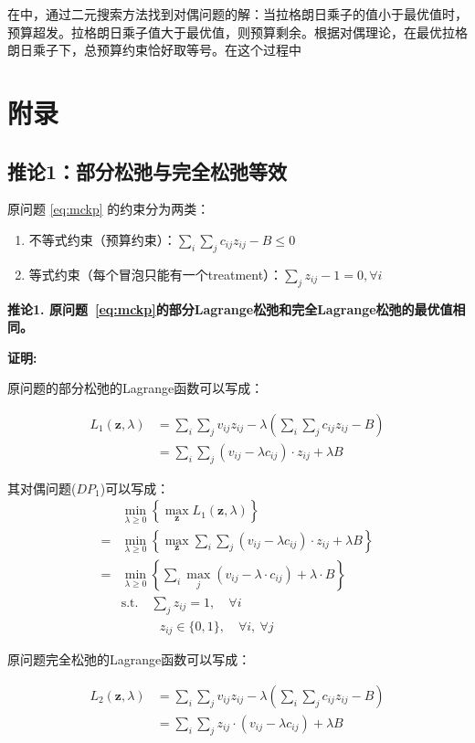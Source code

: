\documentclass[12pt, a4paper]{article}
\begin{document}
在\citet{chen2023two}中，通过二元搜索方法找到对偶问题的解：当拉格朗日乘子的值小于最优值时，预算超发。拉格朗日乘子值大于最优值，则预算剩余。根据对偶理论，在最优拉格朗日乘子下，总预算约束恰好取等号。在这个过程中

\section{附录}
\subsection{推论1：部分松弛与完全松弛等效}
原问题 \eqref{eq:mckp} 的约束分为两类：
\begin{enumerate}
    \item 不等式约束（预算约束）：$\sum_{i}\sum_{j}c_{ij}z_{ij} - B \leq 0$
    \item 等式约束（每个冒泡只能有一个treatment）：$\sum_{j} z_{ij} - 1 = 0, \forall i$
\end{enumerate}
\textbf{推论1. 原问题~\ref{eq:mckp}的部分Lagrange松弛和完全Lagrange松弛的最优值相同。} 

\textbf{证明:}

原问题的部分松弛的Lagrange函数可以写成：

\begin{align}
    L_1(\bm z,\lambda) & = \sum_i\sum_j v_{ij}z_{ij} - \lambda\left(\sum_i\sum_j c_{ij}z_{ij} - B\right)\nonumber \\ & = \sum_i \sum_j \left(v_{ij}-\lambda c_{ij}\right)\cdot z_{ij} + \lambda B
\end{align}

其对偶问题($DP_1$)可以写成：
\begin{align}
    &\min_{\lambda\geq 0}\left\{\max_{\bm z} L_1 (\bm z,\lambda) \right\}\nonumber \\
    =&\min_{\lambda \geq 0}\left\{\max_{\bm z} \sum_i \sum_j \left(v_{ij}-\lambda c_{ij}\right)\cdot z_{ij} + \lambda B   \right\}\nonumber \\
    = & \min_{\lambda\geq 0}\left\{ \sum_i \max_j \left(v_{ij} -\lambda \cdot c_{ij} \right) + \lambda \cdot B\right\}\\
    &\text{s.t.} \quad \sum_{j}z_{ij} =1,\quad \forall i\\
    & \quad\quad\quad z_{ij}\in\{0,1\},\quad\forall i,\ \forall j    
\end{align}

原问题完全松弛的Lagrange函数可以写成：

\begin{align}
    L_2(\bm z, \lambda) &= \sum_i\sum_j v_{ij}z_{ij} - \lambda\left(\sum_i\sum_j c_{ij}z_{ij} - B\right)  \nonumber \\ & = \sum_i\sum_j z_{ij} \cdot \left(v_{ij} - \lambda c_{ij} \right)  +\lambda B
\end{align}
\end{document}
